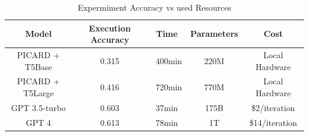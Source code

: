 \begin{table}[!ht]
    \centering
    \begin{tabular}{ccccc}
        \hline
        Model            & \textbf{Execution Accuracy} & \textbf{Time} & \textbf{Parameters} & \textbf{Cost}  \\ \hline
        PICARD + T5Base  & 0.315                       & ~400min       & 220M                & Local Hardware \\ \hline
        PICARD + T5Large & 0.416                       & ~720min       & 770M                & Local Hardware \\ \hline
        GPT 3.5-turbo    & 0.603                       & 37min         & 175B                & \$2/iteration  \\ \hline
        GPT 4            & 0.613                       & 78min         & 1T                  & \$14/iteration \\ \hline
    \end{tabular}
    \caption{Expermiment Accuracy vs used Resources}
    \label{tab:exp-acc-vs-resources}
\end{table}

